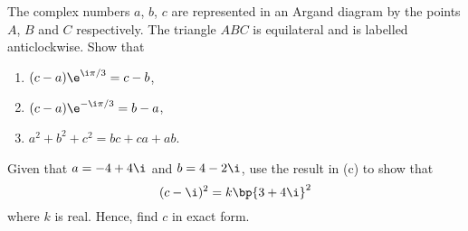 \begin{problem}
    The complex numbers $a$, $b$, $c$ are represented in an Argand diagram by the points $A$, $B$ and $C$ respectively. The triangle $ABC$ is equilateral and is labelled anticlockwise. Show that
    \begin{enumerate}
        \item $(c-a) \e^{\i \pi/3} = c - b$,
        \item $(c-a) \e^{-\i \pi/3} = b - a$,
        \item $a^2 + b^2 + c^2 = bc + ca + ab$.
    \end{enumerate}
    
    Given that $a = -4 + 4\i$ and $b = 4-2\i$, use the result in (c) to show that \[(c-\i)^2 = k\bp{3 + 4\i}^2\] where $k$ is real. Hence, find $c$ in exact form.
\end{problem}
